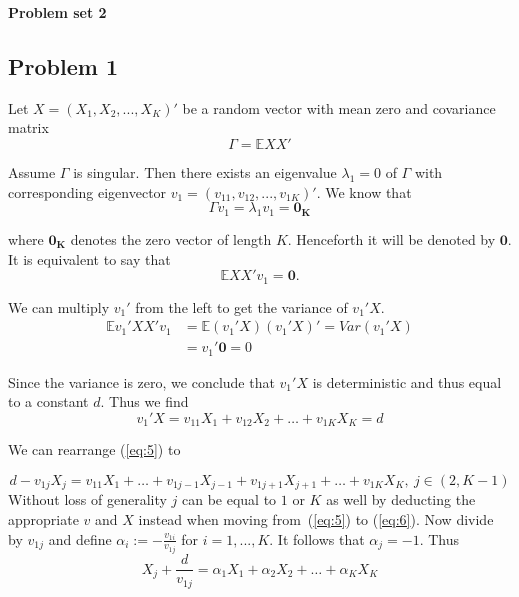 \documentclass{article}
\begin{document}
\begin{center}
\textbf{Problem set 2}
\end{center}
\subsection*{Problem 1}

Let $X = (X_1, X_2, ..., X_K)'$ be a random vector with mean zero and covariance matrix
\begin{equation}
  \label{eq:1}
  \Gamma = \mathbb{E} XX'
\end{equation}

Assume $\Gamma$ is singular. Then there exists an eigenvalue $\lambda_1 = 0$ of $\Gamma$ with corresponding eigenvector $v_1 = (v_{11}, v_{12}, ..., v_{1K})'$. We know that
\begin{equation}
  \label{eq:2}
  \Gamma v_1 = \lambda_1 v_1 = \mathbf{0_K}
\end{equation}
  
where $\mathbf{0_K}$ denotes the zero vector of length $K$. Henceforth it will be denoted by $\mathbf{0}$. It is equivalent to say that
\begin{equation}
  \label{eq:3}
  \mathbb{E} XX'v_1 = \mathbf{0}.
\end{equation}

We can multiply $v_1'$ from the left to get the variance of $v_1'X$.
\begin{equation}
\begin{split}
  \label{eq:4}
  \mathbb{E} v_1'XX'v_1 &= \mathbb{E} (v_1'X)(v_1'X)' = Var(v_1'X)\\
  &= v_1'\mathbf{0} = 0
\end{split}
\end{equation}

Since the variance is zero, we conclude that $v_1'X$ is deterministic and thus equal to a constant $d$. Thus we find
\begin{equation}
  \label{eq:5}
  v_1'X = v_{11} X_1 + v_{12} X_2 + \dots + v_{1K} X_K = d
\end{equation}

We can rearrange (\ref{eq:5}) to

\begin{equation}
  \label{eq:6}
  d - v_{1j} X_j = v_{11} X_1 + \dots + v_{1j-1} X_{j-1} + v_{1j+1}X_{j+1}+ \dots + v_{1K} X_K, \ j \in (2, K-1)
\end{equation}
Without loss of generality $j$ can be equal to $1$ or $K$ as well by deducting the appropriate $v$ and $X$ instead when moving from~(\ref{eq:5}) to (\ref{eq:6}). Now divide by $v_{1j}$ and define $\alpha_i := - \frac{v_{1i}}{v_{1j}}$ for $i = 1, ..., K$. It follows that $\alpha_j = -1$. Thus
\begin{equation}
  \label{eq:7}
 X_j + \frac{d}{v_{1j}}  = \alpha_1 X_1 + \alpha_2 X_2 + \dots + \alpha_K X_K
\end{equation}
\end{document}
